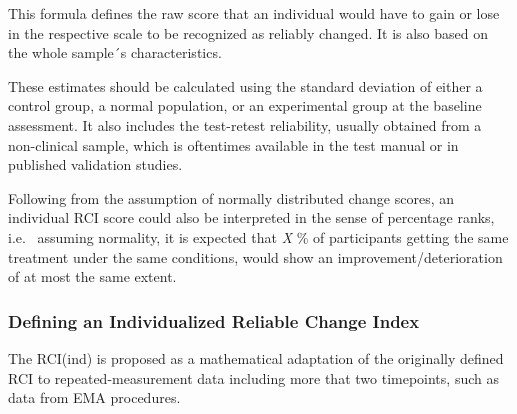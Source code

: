 \documentclass[12pt,twoside]{reedthesis}
\begin{document}
\par

This formula defines the raw score that an individual would have to gain or lose in the respective scale to be recognized as reliably changed. It is also based on the whole sample´s characteristics.

\par

These estimates should be calculated using the standard deviation of either a control group, a normal population, or an experimental group at the baseline assessment. It also includes the test-retest reliability, usually obtained from a non-clinical sample, which is oftentimes available in the test manual or in published validation studies.

\par

Following from the assumption of normally distributed change scores, an individual RCI score could also be interpreted in the sense of percentage ranks, i.e.~
assuming normality, it is expected that \emph{X} \% of participants getting the same treatment under the same conditions, would show an improvement/deterioration of at most the same extent.

\par

\hypertarget{defining-an-individualized-reliable-change-index}{%
\subsubsection{Defining an Individualized Reliable Change Index}\label{defining-an-individualized-reliable-change-index}}

The RCI(ind) is proposed as a mathematical adaptation of the originally defined RCI to repeated-measurement data including more that two timepoints, such as data from EMA procedures.
\end{document}
